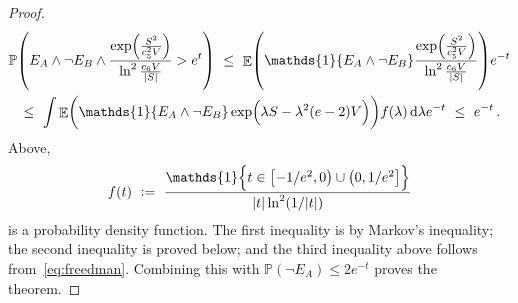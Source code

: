 \documentclass[11pt]{article}
\DeclareMathOperator{\E}{\mathbb{E}}
\renewcommand{\P}{\ensuremath{\mathbb{P}}}
\theoremstyle{remark}
\theoremstyle{definition}
\renewcommand\abs[1]{|#1|} %
\newcommand\ind[1]{\ensuremath{\mathds{1}\{#1\}}}
\newcommand\Parens[1]{\mleft(#1\mright)}
\newcommand\Ind[1]{\mathds{1}\mleft\{#1\mright\}}
\begin{document}
\begin{proof}
\begin{multline*}
    \P\Parens{
      E_A \wedge \neg E_B \wedge
      \frac{
        \exp\Parens{\frac{S^2}{c_5^2V}}
      }{
        \ln^2\frac{c_6V}{|S|}
      }
      > e^t
    }
    \ \leq \
    \E\Parens{
      \ind{E_A \wedge \neg E_B}
      \frac{
        \exp\Parens{\frac{S^2}{c_5^2V}}
      }{
        \ln^2\frac{c_6V}{|S|}
      }
    }
    e^{-t}
    \\
    \ \leq \
    \int
    \E\Parens{
      \ind{E_A \wedge \neg E_B}
      \exp\Parens{ \lambda S - \lambda^2 (e-2) V }
    }
    f(\lambda) \dif\lambda
    e^{-t}
    \ \leq \
    e^{-t}
    \,.
  \end{multline*}
  Above,
  \[
    f(t)
    \ := \
    \frac{
      \Ind{t \in \intco{-1/e^2,0} \cup \intoc{0,1/e^2}}
    }{
      \abs{t}\ln^2(1/\abs{t})
    }
  \]
  is a probability density function.
  The first inequality is by Markov's inequality; the second
  inequality is proved below; and the third inequality above follows
  from~\eqref{eq:freedman}.
  Combining this with $\P(\neg E_A) \leq 2e^{-t}$ proves the theorem.


\end{proof}
\end{document}
